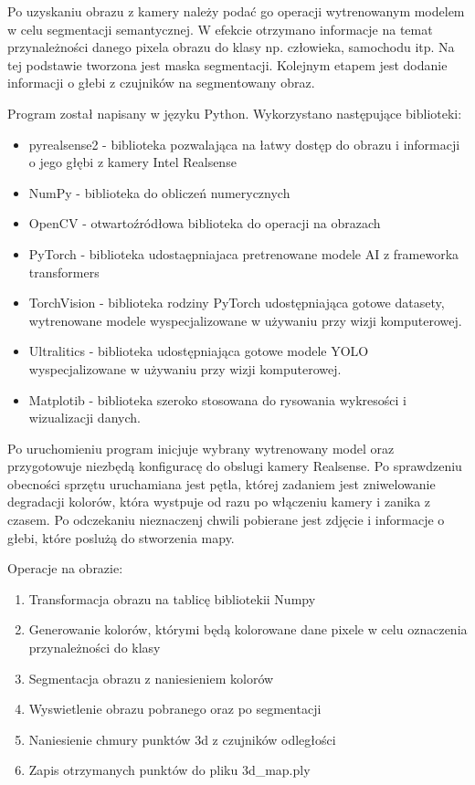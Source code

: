 \documentclass[
]{article}
\providecommand{\tightlist}{%
  \setlength{\itemsep}{0pt}\setlength{\parskip}{0pt}}
\begin{document}
Po uzyskaniu obrazu z kamery należy podać go operacji wytrenowanym modelem w celu segmentacji semantycznej. W efekcie otrzymano informacje na temat przynależności danego pixela obrazu do klasy np. człowieka, samochodu itp. Na tej podstawie tworzona jest maska segmentacji. Kolejnym etapem jest dodanie informacji o głebi z czujników na segmentowany obraz.

Program został napisany w języku Python. Wykorzystano następujące biblioteki:

\begin{itemize}
\tightlist
\item
  pyrealsense2 - biblioteka pozwalająca na łatwy dostęp do obrazu i informacji o jego głębi z kamery Intel Realsense
\item
  NumPy - biblioteka do obliczeń numerycznych
\item
  OpenCV - otwartoźródłowa biblioteka do operacji na obrazach
\item
  PyTorch - biblioteka udostaępniajaca pretrenowane modele AI z frameworka transformers
\item
  TorchVision - biblioteka rodziny PyTorch udostępniająca gotowe datasety, wytrenowane modele wyspecjalizowane w używaniu przy wizji komputerowej.
\item
  Ultralitics - biblioteka udostępniająca gotowe modele YOLO wyspecjalizowane w używaniu przy wizji komputerowej.
\item
  Matplotib - biblioteka szeroko stosowana do rysowania wykresości i wizualizacji danych.
\end{itemize}

Po uruchomieniu program inicjuje wybrany wytrenowany model oraz przygotowuje niezbędą konfiguracę do obslugi kamery Realsense. Po sprawdzeniu obecności sprzętu uruchamiana jest pętla, której zadaniem jest zniwelowanie degradacji kolorów, która wystpuje od razu po włączeniu kamery i zanika z czasem. Po odczekaniu nieznaczenj chwili pobierane jest zdjęcie i informacje o głebi, które poslużą do stworzenia mapy.

Operacje na obrazie:

\begin{enumerate}
\def\labelenumi{\arabic{enumi}.}
\tightlist
\item
  Transformacja obrazu na tablicę bibliotekii Numpy
\item
  Generowanie kolorów, którymi będą kolorowane dane pixele w celu oznaczenia przynależności do klasy
\item
  Segmentacja obrazu z naniesieniem kolorów
\item
  Wyswietlenie obrazu pobranego oraz po segmentacji
\item
  Naniesienie chmury punktów 3d z czujników odległości
\item
  Zapis otrzymanych punktów do pliku 3d\_map.ply
\end{enumerate}
\end{document}
